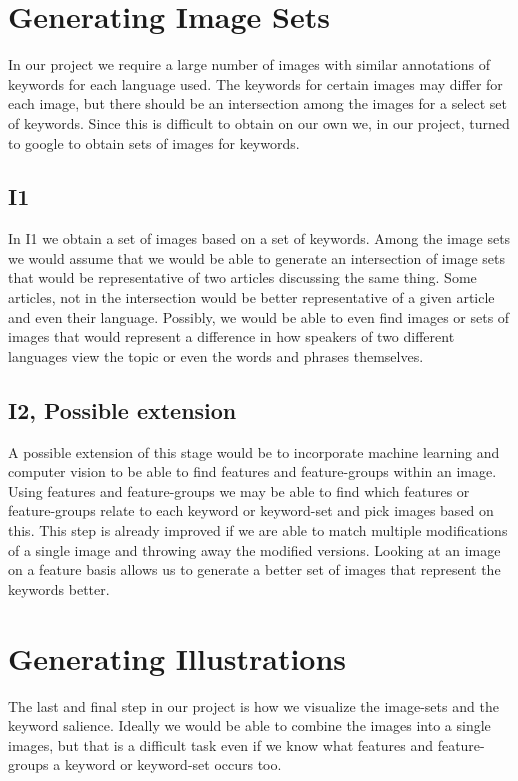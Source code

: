 \documentclass[12pt]{article}
\begin{document}
\section{Generating Image Sets}
In our project we require a large number of images with similar annotations of keywords for each language used. The keywords for certain images may differ for each image, but there should be an intersection among the images for a select set of keywords. Since this is difficult to obtain on our own we, in our project, turned to google to obtain sets of images for keywords.
\subsection{I1}
In I1 we obtain a set of images based on a set of keywords. Among the image sets we would assume that we would 
be able to generate an intersection of image sets that would be representative of two articles discussing the 
same thing. Some articles, not in the intersection would be better representative of a given article and even their language. 
Possibly, we would be able to even find images or sets of images that would represent a difference in how speakers of two different languages
view the topic or even the words and phrases themselves.

\subsection{I2, Possible extension}
A possible extension of this stage would be to incorporate machine learning and computer vision to be able to find features and feature-groups within an image. Using features and feature-groups we may be able to find which features or feature-groups relate to each keyword or keyword-set and pick images based on this. This step is already improved if we are able to match multiple modifications of a single image and throwing away the modified versions. Looking at an image on a feature basis allows
us to generate a better set of images that represent the keywords better.

\section{Generating Illustrations}
The last and final step in our project is how we visualize the image-sets and the keyword salience. Ideally we would be able to combine the images into a single images, but that is a difficult task even if we know what features and feature-groups a keyword or keyword-set occurs too.
\end{document}
